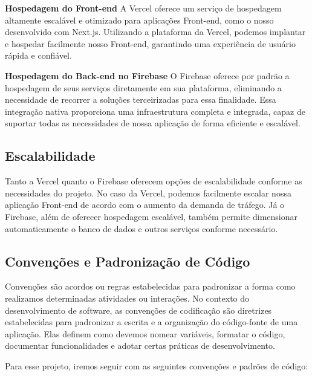 \textbf{Hospedagem do Front-end} \newline
A Vercel oferece um serviço de hospedagem altamente escalável e otimizado para aplicações Front-end, como o nosso desenvolvido com Next.js. Utilizando a plataforma da Vercel, podemos implantar e hospedar facilmente nosso Front-end, garantindo uma experiência de usuário rápida e confiável.

\textbf{Hospedagem do Back-end no Firebase} \newline
O Firebase oferece por padrão a hospedagem de seus serviços diretamente em sua plataforma, eliminando a necessidade de recorrer a soluções terceirizadas para essa finalidade. Essa integração nativa proporciona uma infraestrutura completa e integrada, capaz de suportar todas as necessidades de nossa aplicação de forma eficiente e escalável.

\subsection{Escalabilidade}
Tanto a Vercel quanto o Firebase oferecem opções de escalabilidade conforme as necessidades do projeto. No caso da Vercel, podemos facilmente escalar nossa aplicação Front-end de acordo com o aumento da demanda de tráfego. Já o Firebase, além de oferecer hospedagem escalável, também permite dimensionar automaticamente o banco de dados e outros serviços conforme necessário.

\subsection{Convenções e Padronização de Código}

Convenções são acordos ou regras estabelecidas para padronizar a forma como realizamos determinadas atividades ou interações. No contexto do desenvolvimento de software, as convenções de codificação são diretrizes estabelecidas para padronizar a escrita e a organização do código-fonte de uma aplicação. Elas definem como devemos nomear variáveis, formatar o código, documentar funcionalidades e adotar certas práticas de desenvolvimento.

Para esse projeto, iremos seguir com as seguintes convenções e padrões de código:

